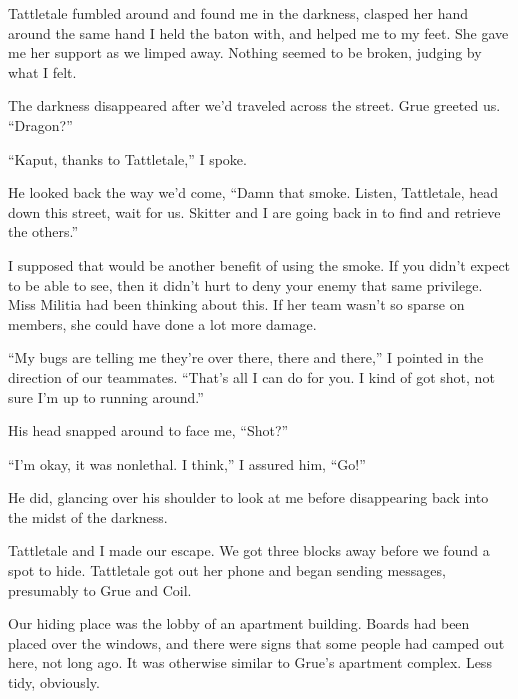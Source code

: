 Tattletale fumbled around and found me in the darkness, clasped her hand around the same hand I held the baton with, and helped me to my feet.  She gave me her support as we limped away.  Nothing seemed to be broken, judging by what I felt.



The darkness disappeared after we'd traveled across the street.  Grue greeted us.  ``Dragon?''



``Kaput, thanks to Tattletale,'' I spoke.



He looked back the way we'd come, ``Damn that smoke.  Listen, Tattletale, head down this street, wait for us.  Skitter and I are going back in to find and retrieve the others.''



I supposed that would be another benefit of using the smoke.  If you didn't expect to be able to see, then it didn't hurt to deny your enemy that same privilege.  Miss Militia had been thinking about this.  If her team wasn't so sparse on members, she could have done a lot more damage.



``My bugs are telling me they're over there, there and there,'' I pointed in the direction of our teammates.  ``That's all I can do for you.  I kind of got shot, not sure I'm up to running around.''



His head snapped around to face me, ``Shot?''



``I'm okay, it was nonlethal.  I think,'' I assured him, ``Go!''



He did, glancing over his shoulder to look at me before disappearing back into the midst of the darkness.



Tattletale and I made our escape.  We got three blocks away before we found a spot to hide.  Tattletale got out her phone and began sending messages, presumably to Grue and Coil.



Our hiding place was the lobby of an apartment building.  Boards had been placed over the windows, and there were signs that some people had camped out here, not long ago.  It was otherwise similar to Grue's apartment complex.  Less tidy, obviously.



